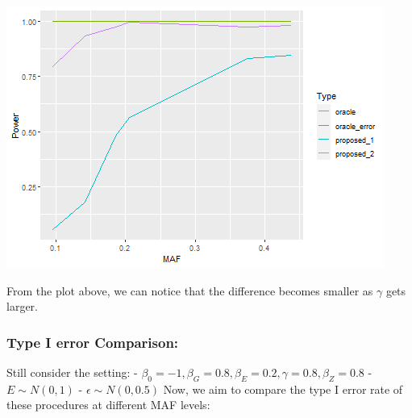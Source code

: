 \documentclass[
]{article}
\begin{document}
\includegraphics{stats-gene-research-progress-v8_files/figure-latex/unnamed-chunk-9-1.png}

From the plot above, we can notice that the difference becomes smaller
as \(\gamma\) gets larger.

\clearpage

\hypertarget{type-i-error-comparison-1}{%
\subsubsection{Type I error
Comparison:}\label{type-i-error-comparison-1}}

Still consider the setting: -
\(\beta_0= -1, \beta_G=0.8, \beta_E= 0.2,\gamma=0.8, \beta_Z=0.8\) -
\(E \sim N(0,1)\) - \(\epsilon \sim N(0,0.5)\) Now, we aim to compare
the type I error rate of these procedures at different MAF levels:
\end{document}
